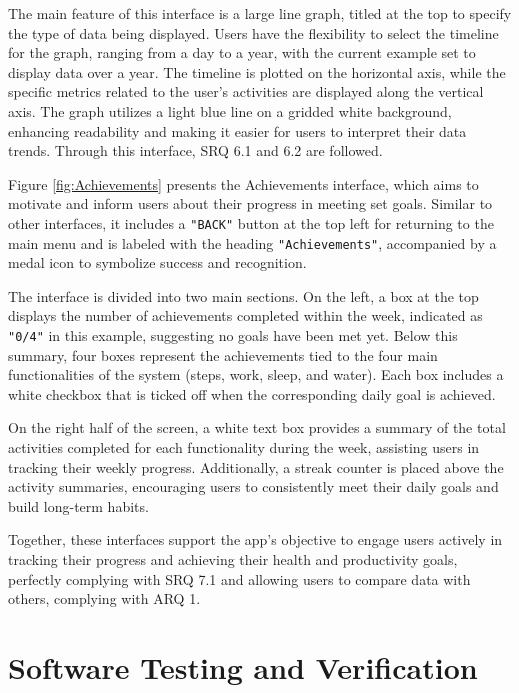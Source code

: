 \documentclass[12pt]{article}
\begin{document}
The main feature of this interface is a large line graph, titled at the top to specify
the type of data being displayed. Users have the flexibility to select the timeline 
for the graph, ranging from a day to a year, with the current example set to display
data over a year. The timeline is plotted on the horizontal axis, while the specific
metrics related to the user’s activities are displayed along the vertical axis. The 
graph utilizes a light blue line on a gridded white background, enhancing readability
and making it easier for users to interpret their data trends. Through this interface, SRQ 6.1 and 6.2 are followed.\par

Figure \ref{fig:Achievements} presents the Achievements interface, which aims to motivate
and inform users about their progress in meeting set goals. Similar to other interfaces,
it includes a \texttt{"BACK"} button at the top left for returning to the main menu and is labeled
with the heading \texttt{"Achievements"}, accompanied by a medal icon to symbolize success and recognition.\par

The interface is divided into two main sections. On the left, a box at the top displays
the number of achievements completed within the week, indicated as \texttt{"0/4"} in this example,
suggesting no goals have been met yet. Below this summary, four boxes represent the 
achievements tied to the four main functionalities of the system (steps, work, sleep, and
water). Each box includes a white checkbox that is ticked off when the corresponding daily
goal is achieved.\par

On the right half of the screen, a white text box provides a summary of the total activities
completed for each functionality during the week, assisting users in tracking their weekly
progress. Additionally, a streak counter is placed above the activity summaries, encouraging
users to consistently meet their daily goals and build long-term habits.\par

Together, these interfaces support the app’s objective to engage users actively in tracking
their progress and achieving their health and productivity goals, perfectly complying with SRQ 7.1 and allowing users to compare data with others, complying with ARQ 1.\par


\section{Software Testing and Verification} \label{sec:testing}
\end{document}
